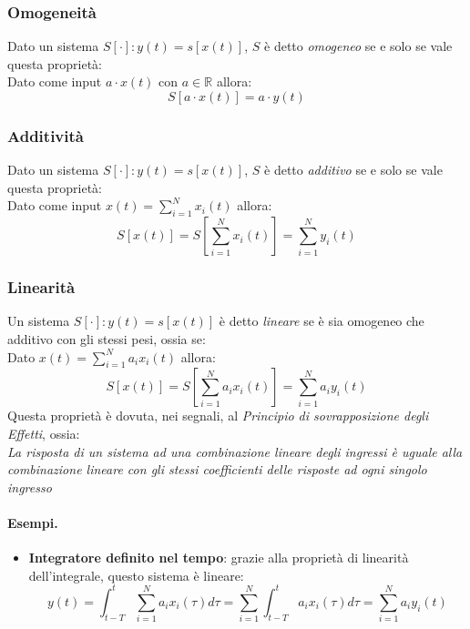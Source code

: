 \subsubsection{Omogeneità}
Dato un sistema $S[\cdot] : y(t) = s[x(t)]$, $S$ è detto \textit{omogeneo} se e solo se vale questa proprietà:\\
Dato come input $a\cdot x(t)$ con $a \in \mathbb{R}$ allora:
\begin{equation}
    S[a\cdot x(t)] = a\cdot y(t)
\end{equation}

\subsubsection{Additività}
Dato un sistema $S[\cdot] : y(t) = s\left[x(t)\right]$, $S$ è detto \textit{additivo} se e solo se vale questa proprietà:\\
Dato come input $x(t) = \sum_{i = 1}^{N} x_i(t)$ allora:
\begin{equation}
    S[x(t)] = S\left[\sum_{i = 1}^{N} x_i(t)\right] = \sum_{i = 1}^{N} y_i(t)
\end{equation}

\subsubsection{Linearità}
Un sistema $S[\cdot] : y(t) = s\left[x(t)\right]$ è detto \textit{lineare} se è sia omogeneo che additivo con gli stessi pesi, ossia se:\\
Dato $x(t) = \sum_{i = 1}^{N} a_i x_i(t)$ allora:
\begin{equation}
    S[x(t)] = S\left[\sum_{i = 1}^{N} a_i x_i(t)\right] = \sum_{i = 1}^{N} a_i y_i(t)
\end{equation}
Questa proprietà è dovuta, nei segnali, al \textit{Principio di sovrapposizione degli Effetti}, ossia:\\
\textit{La risposta di un sistema ad una combinazione lineare degli ingressi è uguale alla combinazione lineare con gli stessi
coefficienti delle risposte ad ogni singolo ingresso}

\paragraph{Esempi.}
\begin{itemize}
    \item \textbf{Integratore definito nel tempo}: grazie alla proprietà di linearità dell'integrale, questo sistema è lineare:
    \begin{equation}
        y(t) = \int_{t -T}^{t} \sum_{i = 1}^{N} a_i x_i(\tau) d\tau = \sum_{i = 1}^{N}  \int_{t -T}^{t}  a_i x_i(\tau) d\tau = \sum_{i = 1}^{N} a_i y_i(t)
    \end{equation}
\end{itemize}


